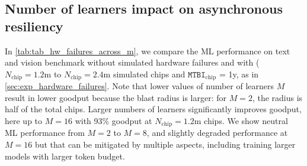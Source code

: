 \documentclass[11pt, a4paper, twocolumn, copyright, google]{google}
\begin{document}
\subsection{Number of learners impact on asynchronous resiliency}

In \autoref{tab:tab_hw_failures_across_m}, we compare the ML performance on text and vision benchmark without simulated hardware failures and with ($N_\text{chip}=1.2\text{m}$ to $N_\text{chip}=2.4\text{m}$ simulated chips and $\texttt{MTBI}_\text{chip}$ = 1y, as in \autoref{sec:exp_hardware_failures}. Note that lower values of number of learners $M$ result in lower goodput because the blast radius is larger: for $M=2$, the radius is half of the total chips. Larger numbers of learners significantly improves goodput, here up to $M=16$ with 93\% goodput at $N_\text{chip}=1.2\text{m}$ chips. We show neutral ML performance from $M=2$ to $M=8$, and slightly degraded performance at $M=16$ but that can be mitigated by multiple aspects, including training larger models with larger token budget.
\end{document}

